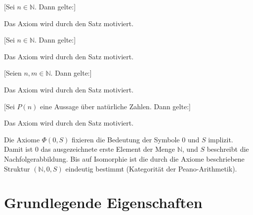 \documentclass[main.tex]{subfiles}
\begin{document}
[Sei \(n \in \mathbb{N}\). Dann gelte:]
\begin{remark}
Das Axiom wird durch den Satz 
motiviert.
\end{remark}

[Sei \(n \in \mathbb{N}\). Dann gelte:]
\begin{remark}
Das Axiom wird durch den Satz 
motiviert.
\end{remark}

[Seien \(n,m \in \mathbb{N}\). Dann gelte:]
\begin{remark}
Das Axiom wird durch den Satz 
motiviert.
\end{remark}

[Sei \(P(n)\) eine Aussage über natürliche Zahlen. Dann gelte:]
\begin{remark}
Das Axiom wird durch den Satz 
motiviert.
\end{remark}
\label{rule:Induktion}

\begin{remark}
Die Axiome \(\Phi(0,S)\) fixieren die Bedeutung der Symbole \(0\) und \(S\) 
implizit. 
Damit ist \(0\) das ausgezeichnete erste Element der Menge \(\mathbb{N}\), 
und \(S\) beschreibt die Nachfolgerabbildung. 
Bis auf Isomorphie ist die durch die Axiome beschriebene Struktur 
\((\mathbb{N},0,S)\) eindeutig bestimmt (Kategorität der Peano-Arithmetik).
\end{remark}


\chapter{Grundlegende Eigenschaften}
\end{document}
